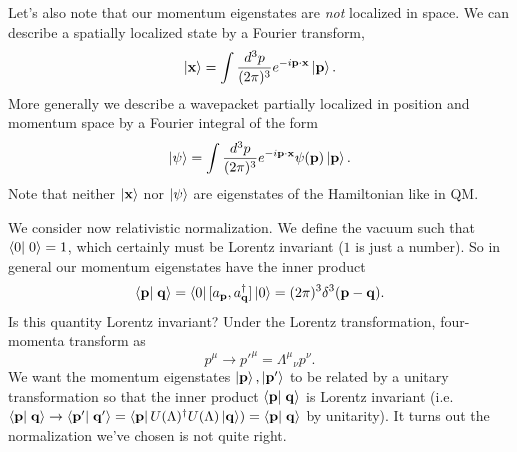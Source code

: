 Let's also note that our momentum eigenstates are \emph{not} localized in space. We can describe a spatially localized state by a Fourier transform,
$$\left| \boldsymbol{\mathbf{x}} \right> = \int \frac{d^3 p}{(2\pi)^3} e^{-i \boldsymbol{\mathbf{p}} \cdot \boldsymbol{\mathbf{x}}} \left| \boldsymbol{\mathbf{p}} \right>.$$
More generally we describe a wavepacket partially localized in position and momentum space by a Fourier integral of the form
$$\left| \psi \right> = \int\frac{d^3p}{(2\pi)^3} e^{-i\boldsymbol{\mathbf{p}} \cdot \boldsymbol{\mathbf{x}}} \psi(\boldsymbol{\mathbf{p}})\left| \boldsymbol{\mathbf{p}} \right>.$$
Note that neither $\left| \boldsymbol{\mathbf{x}} \right>$ nor $\left| \psi \right>$ are eigenstates of the Hamiltonian like in QM.

We consider now relativistic normalization. We define the vacuum such that $\braket{0}{0}=1$, which certainly must be Lorentz invariant ($1$ is just a number). So in general our momentum eigenstates have the inner product
$$\braket{\vec p}{\vec q}=\bra{0}[a_{\pv},a_{\vec q}^\dagger] \ket{0}=(2\pi)^3 \delta^3(\vec p - \vec q).$$
Is this quantity Lorentz invariant? Under the Lorentz transformation, four-momenta transform as $$p^\mu \to {p'}^\mu=\Lambda^\mu{}_\nu p^\nu.$$
We want the momentum eigenstates $\left| \boldsymbol{\mathbf{p}} \right>, \left| \boldsymbol{\mathbf{p}}' \right>$ to be related by a unitary transformation so that the inner product $\braket{\vec p}{\vec q}$ is Lorentz invariant (i.e. $\braket{\vec p}{\vec q}\to \braket{\vec p'}{\vec q'}=\bra{\pv}U(\Lambda)^\dagger U(\Lambda)\ket{\vec q})=\braket{\vec p}{\vec q}$ by unitarity). It turns out the normalization we've chosen is not quite right.


